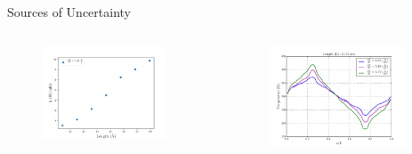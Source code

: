 \documentclass[xcolor={x11names,table},compress,svgnames,mathserif]{beamer}
\renewcommand{\(}{\begin{columns}}
\renewcommand{\)}{\end{columns}}
\newcommand{\<}[1]{\begin{column}{#1}}
\renewcommand{\>}{\end{column}}
\begin{document}
\begin{frame}{Sources of Uncertainty}

\begin{columns}
\begin{column}{0.5\textwidth}

\begin{center}
\begin{figure}[htbp]
  \includegraphics[width=0.9\textwidth]{./Figures/cond_size}
\end{figure}
\end{center}

\end{column}
\hspace{-15mm}
\begin{column}{0.5\textwidth}

\begin{center}
\begin{figure}[htbp]
  \includegraphics[width=0.9\textwidth]{./Figures/temp_plot}
\end{figure}
\end{center}

\end{column}
\end{columns}


\end{frame}
\end{document}
